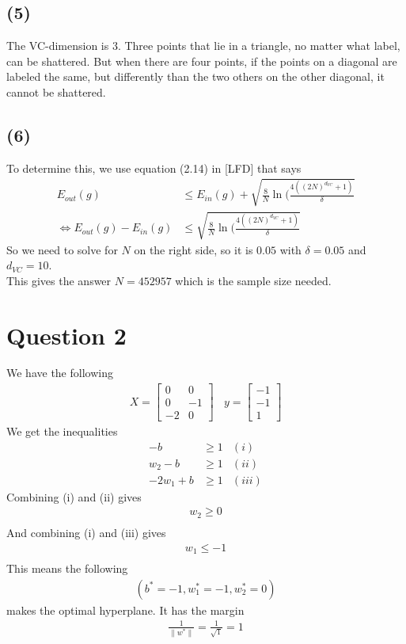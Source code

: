 \documentclass[a4paper]{article}
\begin{document}
\subsection*{(5)}
The VC-dimension is $3$. Three points that lie in a triangle, no matter what label, can be shattered. But when there are four points, if the points on a diagonal are labeled the same, but differently than the two others on the other diagonal, it cannot be shattered.

\subsection*{(6)}
To determine this, we use equation (2.14) in [LFD] that says
\begin{align*}
E_{out}(g)&\leq E_{in}(g)+\sqrt{\frac{8}{N}\ln(\frac{4((2N)^{d_{VC}}+1)}{\delta}} \\
\Leftrightarrow E_{out}(g)-E_{in}(g)&\leq \sqrt{\frac{8}{N}\ln(\frac{4((2N)^{d_{VC}}+1)}{\delta}} 
\end{align*}
So we need to solve for $N$ on the right side, so it is $0.05$ with $\delta=0.05$ and $d_{VC}=10$.\\
This gives the answer $N=452957$ which is the sample size needed.

\newpage
\section*{Question 2}
We have the following
\begin{align*}
X=
\begin{bmatrix}
0 & 0 \\
0 & -1 \\
-2 & 0
\end{bmatrix}
\ \ \ \
y=
\begin{bmatrix}
-1 \\
-1 \\
1
\end{bmatrix}
\end{align*}
We get the inequalities
\begin{align*}
-b&\geq 1 &(i) \\  
w_2-b&\geq 1 &(ii) \\
-2w_1+b&\geq 1 &(iii)
\end{align*}
Combining (i) and (ii) gives
\begin{align*}
w_2\geq 0 \\ 
\end{align*}
And combining (i) and (iii) gives
\begin{align*}
w_1\leq -1 \\ 
\end{align*}
This means the following
\begin{align*}
(b^*=-1,w_1^*=-1,w_2^*=0)
\end{align*}
makes the optimal hyperplane. It has the margin
\begin{align*}
\frac{1}{\|w^*\|}=\frac{1}{\sqrt{1}}=1
\end{align*}
\end{document}
